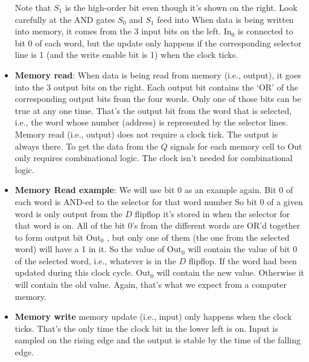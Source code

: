 \documentclass{report}
\begin{document}
\begin{itemize}
                \bigbreak \noindent 
                Note that $S_{1}$ is the high-order bit even though it’s shown on the right. Look carefully at the AND gates $S_{0}$ and $S_{1}$ feed into
                \bigbreak \noindent 
                When data is being written into memory, it comes from the 3 input bits on the left.
                \bigbreak \noindent 
                $\text{In}_{0}$ is connected to bit 0 of each word, but the update only happens if the corresponding selector line is 1 (and the write enable bit is 1) when the clock ticks.
                \bigbreak \noindent 
            \item \textbf{Memory read}: When data is being read from memory (i.e., output), it goes into the 3 output bits on the right.
                \bigbreak \noindent 
                Each output bit contains the ‘OR’ of the corresponding output bits from the four words.
                \bigbreak \noindent 
                Only one of those bits can be true at any one time. That’s the output bit from the word that is selected, i.e., the word whose number (address) is represented by the selector lines.
                \bigbreak \noindent 
                Memory read (i.e., output) does not require a clock tick. The output is always there. To get the data from the $Q$ signals for each memory cell to Out only requires combinational logic. The clock isn't needed for combinational logic.
            \item \textbf{Memory Read example}: We will use bit 0 as an example again. Bit 0 of each word is AND-ed to the selector for that word number
                \bigbreak \noindent 
                So bit 0 of a given word is only output from the $D$ flipflop it’s stored in when the selector for that word is on.
                \bigbreak \noindent 
                All of the bit 0’s from the different words are OR’d together to form output bit $\text{Out}_{0}$ , but only one of them (the one from the selected word) will have a 1 in it.
                \bigbreak \noindent 
                So the value of $\text{Out}_{0}$ will contain the value of bit 0 of the selected word, i.e., whatever is in the $D$ flipflop. If the word had been updated during this clock cycle. $\text{Out}_{0} $ will contain the new value. Otherwise it will contain the old value. Again, that’s what we expect from a computer memory.
            \item \textbf{Memory write}
                \bigbreak \noindent 
                memory update (i.e., input) only happens when the clock ticks. That’s the only time the clock bit in the lower left is on. Input is sampled on the rising edge and the output is stable by the time of the falling edge.

\end{itemize}
\end{document}
